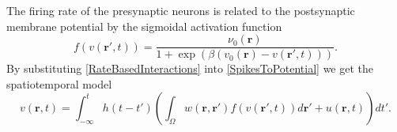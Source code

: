 \documentclass[onecolumn,draftcls]{IEEEtran}
\begin{document}
The firing rate of the presynaptic neurons is related to the postsynaptic membrane potential by the sigmoidal activation function
\begin{equation}\label{ActivationFunction}
	f\left( v\left( \mathbf{r}', t \right) \right) = \frac{\nu _0\left(\mathbf{r}\right)}{1 + \exp \left( \beta \left( v_0\left( \mathbf{r} \right) - v\left(\mathbf{r}',t\right) \right) \right)}.
\end{equation}
By substituting \ref{RateBasedInteractions} into \ref{SpikesToPotential}  we get the spatiotemporal model
\begin{equation}\label{FullDoubleIntModel}
	v\left(\mathbf{r},t\right) = \int_{-\infty}^t h\left(t - t'\right) \left(\int_\Omega   w\left(\mathbf{r},\mathbf{r}'\right) f\left( v\left( \mathbf{r}',t \right)\right)d\mathbf{r}' + u(\mathbf{r},t) \right)dt'.
\end{equation}
\end{document}
